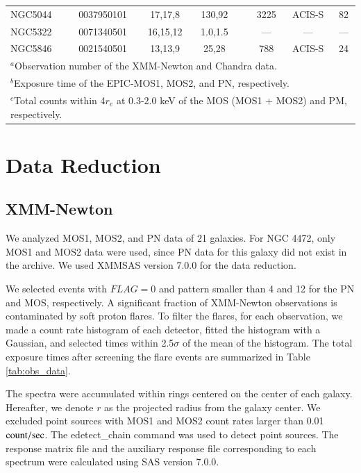 \documentclass[structabstract]{aa}
\begin{document}
\begin{table}
\begin{tabular}{lccccccc}
NGC5044 & 0037950101 & 17,17,8   & 130,92  & & 3225 & ACIS-S & 82  \\
NGC5322 & 0071340501 & 16,15,12  & 1.0,1.5 & & ---  & ---    & --- \\
NGC5846 & 0021540501 & 13,13,9   & 25,28   & & 788  & ACIS-S & 24  \\
\hline
\multicolumn{8}{l}{$^a$Observation number of the XMM-Newton and Chandra
 data.}\\
\multicolumn{8}{l}{$^b$Exposure time of the EPIC-MOS1, MOS2, and PN,
 respectively.}\\
\multicolumn{8}{l}{$^c$Total counts within 4$r_e$ at 0.3-2.0 keV of the
 MOS (MOS1 + MOS2) and PM, respectively.}\\
\end{tabular}
\end{table}

\section{Data Reduction}
\label{sec:dp}

\subsection{XMM-Newton}

We analyzed MOS1, MOS2, and PN data of 21 galaxies. For NGC 4472, only
MOS1 and MOS2 data were used, since PN data for this galaxy did not
exist in the archive. We used XMMSAS version 7.0.0 for the data
reduction. 

We selected events with $FLAG = 0$ and pattern smaller than 4 and 12 for
the PN and MOS, respectively. A significant fraction of XMM-Newton
observations is contaminated by soft proton flares. To filter the flares, for each
observation, we made a count rate histogram of each detector, fitted
the histogram with a Gaussian, and selected times within 2.5$\sigma$ of the
mean of the histogram. The total exposure times after screening the
flare events are summarized in Table \ref{tab:obs_data}.

The spectra were accumulated within rings centered on the center of
each galaxy. Hereafter, we denote $r$ as the projected radius from the
galaxy center. We excluded point sources with MOS1 and MOS2 count
rates larger than 0.01 ${\rm count/sec}$. The edetect\_chain command was used to
detect point sources. The response matrix file and the auxiliary
response file corresponding to each spectrum were calculated using SAS
version 7.0.0. 
\end{document}
